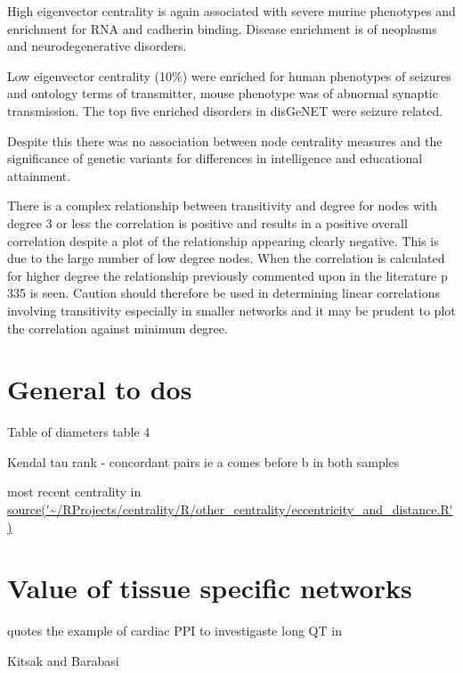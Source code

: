 High eigenvector centrality is again associated with severe murine phenotypes and enrichment for RNA and cadherin binding. Disease enrichment is of neoplasms and neurodegenerative disorders. 

Low eigenvector centrality (10\%) were enriched for human phenotypes of seizures and ontology terms of transmitter, mouse phenotype was of abnormal synaptic transmission. The top five enriched disorders in disGeNET were seizure related. 

Despite this there was no association between node centrality measures and the significance of genetic variants for differences in intelligence and educational attainment.

There is a complex relationship between transitivity and degree for nodes with degree 3 or less the correlation is positive and results in a positive overall correlation despite a plot of the relationship appearing clearly negative. This is due to the large number of low degree nodes. When the correlation is calculated for higher degree the relationship previously commented upon in the literature \cite{newman} p 335 is seen. Caution should therefore be used in determining linear correlations involving transitivity especially in smaller networks and it may be prudent to plot the correlation against minimum degree.


 
\section{General to dos}

Table of diameters \cite{crescenzi2013computing}
 table 4 

Kendal tau rank - concordant pairs ie a comes before b in both samples 

most recent centrality in \url{source('~/RProjects/centrality/R/other_centrality/eccentricity_and_distance.R')}


\section{Value of tissue specific networks}
\cite{parikshak2015systems} quotes the example of cardiac PPI to investigaste long QT in \cite{lundby2014annotation}

Kitsak and Barabasi \cite{kitsak2016tissue}


